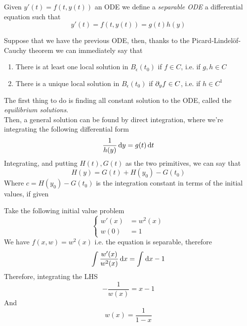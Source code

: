 \documentclass[../complete.tex]{subfiles}
\begin{document}
\begin{dfn}
	Given $y'(t)=f(t,y(t))$ an ODE we define a \textit{separable ODE} a differential equation such that
	\begin{equation*}
		y'(t)=f(t,y(t))=g(t)h(y)
	\end{equation*}
\end{dfn}
\begin{mtd}
	Suppose that we have the previous ODE, then, thanks to the Picard-Lindelöf-Cauchy theorem we can immediately say that
	\begin{enumerate}
	\item There is at least one local solution in $B_\epsilon(t_0)$ if $f\in C$, i.e. if $g,h\in C$
	\item There is a unique local solution in $B_\epsilon(t_0)$ if $\partial_y f\in C$, i.e. if $h\in C^1$
	\end{enumerate}
	The first thing to do is finding all constant solution to the ODE, called the \textit{equilibrium solutions}.\\
	Then, a general solution can be found by direct integration, where we're integrating the following differential form
	\begin{equation*}
		\frac{1}{h(y)}\operatorname{d\!} y=g(t)\operatorname{d\!} t
	\end{equation*}
	Integrating, and putting $H(t), G(t)$ as the two primitives, we can say that
	\begin{equation*}
		H(y)=G(t)+H(y_0)-G(t_0)
	\end{equation*}
	Where $c=H(y_0)-G(t_0)$ is the integration constant in terms of the initial values, if given
\end{mtd}
\begin{eg}
	Take the following initial value problem
	\begin{equation*}
		\left\{\begin{aligned}
				w'(x)&=w^2(x)\\
				w(0)&=1
		\end{aligned}\right.
	\end{equation*}
	We have $f(x,w)=w^2(x)$ i.e. the equation is separable, therefore
	\begin{equation*}
		\int\frac{w'(x)}{w^2(x)}\operatorname{d\!} x=\int_{}^{}\operatorname{d\!} x-1
	\end{equation*}
	Therefore, integrating the LHS
	\begin{equation*}
		-\frac{1}{w(x)}=x-1
	\end{equation*}
	And
	\begin{equation*}
		w(x)=\frac{1}{1-x}
	\end{equation*}
\end{eg}
\end{document}
